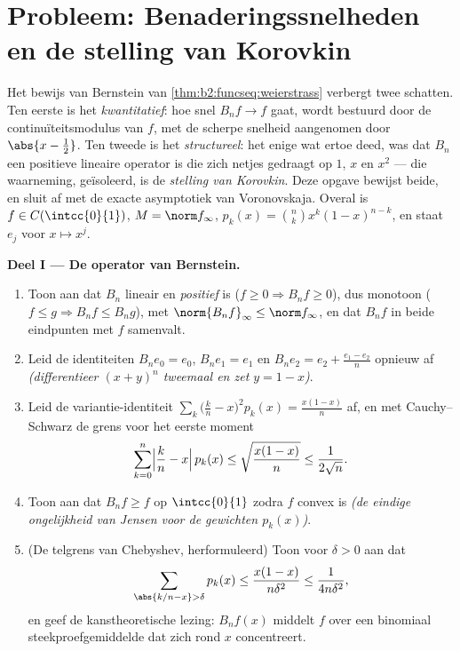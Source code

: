 \section{Probleem: Benaderingssnelheden en de stelling van Korovkin}

\begin{problem}\label{pb:b2:funcseq:1}
Het bewijs van Bernstein van \cref{thm:b2:funcseq:weierstrass}
verbergt twee schatten. Ten eerste is het \emph{kwantitatief}: hoe
snel $B_nf \to f$ gaat, wordt bestuurd door de
continuïteitsmodulus van $f$, met de scherpe snelheid aangenomen
door $\abs{x - \frac12}$. Ten tweede is het \emph{structureel}: het
enige wat ertoe deed, was dat $B_n$ een positieve lineaire operator
is die zich netjes gedraagt op $1$, $x$ en $x^2$ --- die
waarneming, geïsoleerd, is de \emph{stelling van
Korovkin}. Deze opgave bewijst beide,
en sluit af met de exacte asymptotiek van Voronovskaja. Overal is
$f \in C(\intcc{0}{1})$, $M = \norm f_\infty$, $p_k(x) = \binom nk
x^k(1-x)^{n-k}$, en staat $e_j$ voor $x \mapsto x^j$.

\medskip
\noindent\textbf{Deel I --- De operator van Bernstein.}
\begin{enumerate}
  \item Toon aan dat $B_n$ lineair en \emph{positief} is ($f \geq 0
        \Rightarrow B_nf \geq 0$), dus monotoon ($f \leq g
        \Rightarrow B_nf \leq B_ng$), met $\norm{B_nf}_\infty \leq
        \norm f_\infty$, en dat $B_nf$ in beide eindpunten met $f$
        samenvalt.
  \item Leid de identiteiten $B_n e_0 = e_0$, $B_n e_1 = e_1$ en
        $B_n e_2 = e_2 + \frac{e_1 - e_2}{n}$ opnieuw af
        \emph{(differentieer $(x + y)^n$ tweemaal en zet $y = 1 -
        x$)}.
  \item Leid de variantie-identiteit $\sum_k \bigl(\frac kn -
        x\bigr)^2 p_k(x) = \frac{x(1-x)}{n}$ af, en met
        Cauchy--Schwarz de grens voor het eerste moment
        \[
        \sum_{k=0}^{n}\Bigl|\frac kn - x\Bigr|\,p_k(x)
        \leq \sqrt{\frac{x(1-x)}{n}} \leq \frac{1}{2\sqrt n} .
        \]
  \item Toon aan dat $B_nf \geq f$ op $\intcc{0}{1}$ zodra $f$
        convex is \emph{(de eindige ongelijkheid van Jensen voor de
        gewichten $p_k(x)$)}.
  \item (De telgrens van Chebyshev, herformuleerd) Toon voor
        $\delta > 0$ aan dat
        \[
        \sum_{\abs{k/n - x} > \delta} p_k(x)
        \leq \frac{x(1-x)}{n\delta^2}
        \leq \frac{1}{4n\delta^2} ,
        \]
        en geef de kanstheoretische lezing: $B_nf(x)$ middelt $f$
        over een binomiaal steekproefgemiddelde dat zich rond $x$
        concentreert.
\end{enumerate}


\end{problem}

